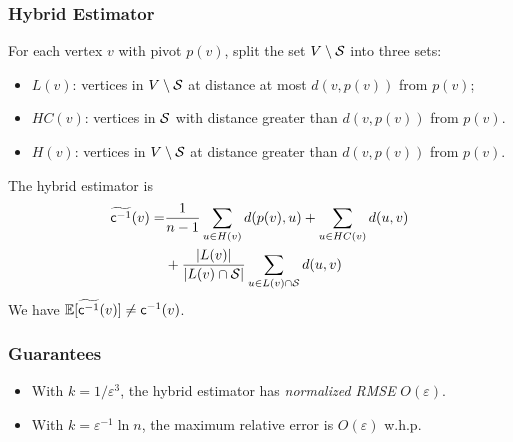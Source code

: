 \begin{frame}
  \frametitle{Hybrid Estimator}
  For each vertex $v$ with pivot $p(v)$, split the set $V\setminus{\cal S}$ into
  three sets:
  \pause
  \begin{itemize}
    \item $L(v)$: vertices in $V\setminus{\cal S}$ at distance at most $d(v,p(v))$
      from $p(v)$;
    \pause
    \item $HC(v)$: vertices in ${\cal S}$ with distance greater than $d(v,p(v))$
      from $p(v)$.
    \pause
    \item $H(v)$: vertices in $V\setminus{\cal S}$ at distance greater than
      $d(v,p(v))$ from $p(v)$.
  \end{itemize}
  \pause
  The hybrid estimator is
  \begin{align*}
    \widetilde{\mathsf{c}^{-1}}(v)=&\frac{1}{n-1}\sum_{u\in
    H(v)}d(p(v),u)+\sum_{u\in HC(v)}d(u,v)\\
    &+\frac{|L(v)|}{|L(v)\cap{\cal S}|}\sum_{u\in L(v)\cap{\cal S}}d(u,v)
  \end{align*}
  \pause
  We have $\mathbb{E}[\widetilde{\mathsf{c}^{-1}}(v)]\neq\mathsf{c}^{-1}(v)$.
\end{frame}

\begin{frame}
  \frametitle{Guarantees}
  \begin{theorem}
    \begin{itemize}
      \item With $k=1/\varepsilon^3$, the hybrid estimator has \emph{normalized
        RMSE} $O(\varepsilon)$.
      \item With $k=\varepsilon^{-1}\ln n$, the maximum relative error is
        $O(\varepsilon)$ w.h.p.
    \end{itemize}
  \end{theorem}
\end{frame}

